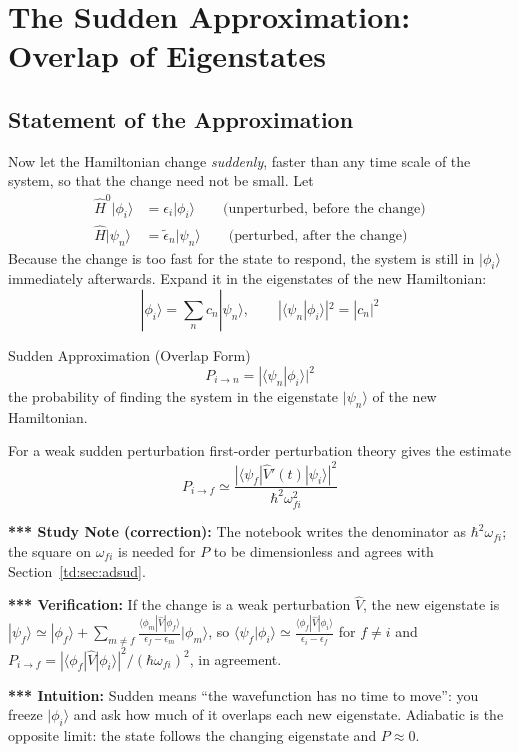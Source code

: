 \documentclass[11pt,a4paper]{article}
\begin{document}
\section{The Sudden Approximation: Overlap of Eigenstates}
\label{td:sec:sudden}

\subsection{Statement of the Approximation}
Now let the Hamiltonian change \textit{suddenly}, faster than any time scale of the system, so that the change need not be small. Let
\begin{align*}
\hat H^0|\phi_i\rangle&=\epsilon_i|\phi_i\rangle \qquad\text{(unperturbed, before the change)}\\
\hat H|\psi_n\rangle&=\tilde\epsilon_n|\psi_n\rangle \qquad\text{(perturbed, after the change)}
\end{align*}
Because the change is too fast for the state to respond, the system is still in $|\phi_i\rangle$ immediately afterwards. Expand it in the eigenstates of the new Hamiltonian:
\[
|\phi_i\rangle=\sum_nc_n|\psi_n\rangle,\qquad |\langle\psi_n|\phi_i\rangle|^2=|c_n|^2
\]
\begin{thm}{Sudden Approximation (Overlap Form)}
\[
P_{i\to n}=|\langle\psi_n|\phi_i\rangle|^2
\]
the probability of finding the system in the eigenstate $|\psi_n\rangle$ of the new Hamiltonian.
\end{thm}
For a weak sudden perturbation first-order perturbation theory gives the estimate
\[
P_{i\to f}\simeq\frac{|\langle\psi_f|\hat V'(t)|\psi_i\rangle|^2}{\hbar^2\omega_{fi}^2}
\]

\textbf{*** Study Note (correction):} The notebook writes the denominator as $\hbar^2\omega_{fi}$; the square on $\omega_{fi}$ is needed for $P$ to be dimensionless and agrees with Section~\ref{td:sec:adsud}.

\textbf{*** Verification:} If the change is a weak perturbation $\hat V$, the new eigenstate is $|\psi_f\rangle\simeq|\phi_f\rangle+\sum_{m\ne f}\frac{\langle\phi_m|\hat V|\phi_f\rangle}{\epsilon_f-\epsilon_m}|\phi_m\rangle$, so $\langle\psi_f|\phi_i\rangle\simeq\frac{\langle\phi_f|\hat V|\phi_i\rangle}{\epsilon_i-\epsilon_f}$ for $f\neq i$ and $P_{i\to f}=|\langle\phi_f|\hat V|\phi_i\rangle|^2/(\hbar\omega_{fi})^2$, in agreement.

\textbf{*** Intuition:} Sudden means ``the wavefunction has no time to move'': you freeze $|\phi_i\rangle$ and ask how much of it overlaps each new eigenstate. Adiabatic is the opposite limit: the state follows the changing eigenstate and $P\approx0$.
\end{document}
